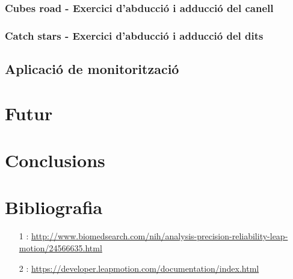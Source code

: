 \documentclass[12pt,a4paper,catalan]{article}
\begin{document}
	\subsubsection{Cubes road - Exercici d'abducció i adducció del canell}
	\subsubsection{Catch stars - Exercici d'abducció i adducció del dits}
	\subsection{Aplicació de monitorització}
	\section{Futur}
	\section{Conclusions}
	\section{Bibliografia}
	\begin{enumerate}
		\item [1]: \url{http://www.biomedsearch.com/nih/analysis-precision-reliability-leap-motion/24566635.html}
		\item [2]: \url{https://developer.leapmotion.com/documentation/index.html}
	\end{enumerate}
	
\end{document}
